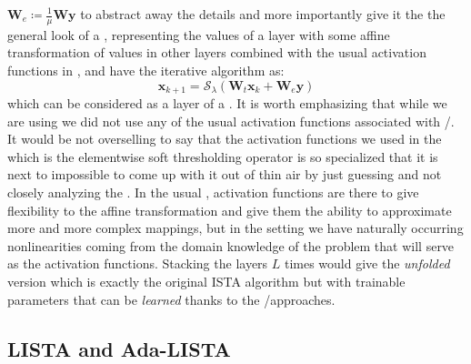 $\boldsymbol{W}_e \coloneqq \frac{1}{\mu}\boldsymbol{W}\boldsymbol{y}$ to abstract away the details and more importantly give it the the general look of a \nn, representing the values of a layer with 
some affine transformation of values in other layers combined with the usual activation functions in \nn, and have the iterative algorithm 
as:
\begin{equation}
  \boldsymbol{x}_{k+1} = \mathcal{S}_\lambda\left(\boldsymbol{W}_t\boldsymbol{x}_{k}+\boldsymbol{W}_e\boldsymbol{y}\right)
\end{equation}
which can be considered as a layer of a \nn. It is worth emphasizing that 
while we are using \nns we did not use any of the usual activation functions associated with \ml/\dl. 
It would be not overselling to say that the activation functions we used in the \srp which is the elementwise soft thresholding operator  is so 
specialized that it is next to impossible to come up with it out of thin air by just guessing and not closely analyzing the \srp.
In the usual \nns, activation functions are there to give flexibility to the affine transformation 
and give them the ability to approximate more and more complex mappings, but in the \du setting we have naturally occurring 
nonlinearities coming from the domain knowledge of the problem that will serve as the activation 
functions. Stacking the layers $L$ times would give the \emph{unfolded} version which is exactly the original \ac{ISTA} 
algorithm but with trainable parameters that can be \emph{learned} thanks to the \ml/\dl approaches.

\subsection{LISTA and Ada-LISTA}

